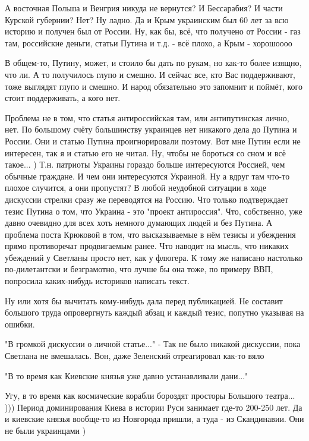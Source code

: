 \begin{itemize}
А восточная Польша и Венгрия никуда не вернутся? И Бессарабия? И части Курской
губернии? Нет? Ну ладно. Да и Крым украинским был 60 лет за всю историю и
получен был от России. Ну, как бы, всё, что получено от России - газ там,
российские деньги, статьи Путина и т.д. - всё плохо, а Крым - хорошоооо \Laughey[1.0][white]⁠ ⁠

В общем-то, Путину, может, и стоило бы дать по рукам, но как-то более изящно,
что ли. А то получилось глупо и смешно. И сейчас все, кто Вас поддерживают,
тоже выглядят глупо и смешно. И народ обязательно это запомнит и поймёт, кого
стоит поддерживать, а кого нет.


Проблема не в том, что статья антироссийская там, или антипутинская лично, нет.
По большому счёту большинству украинцев нет никакого дела до Путина и России.
Они и статью Путина проигнорировали поэтому. Вот мне Путин если не интересен,
так я и статью его не читал. Ну, чтобы не бороться со сном и всё такое... )
Т.н. патриоты Украины гораздо больше интересуются Россией, чем обычные
граждане. И чем они интересуются Украиной. Ну а вдруг там что-то плохое
случится, а они пропустят? В любой неудобной ситуации в ходе дискуссии стрелки
сразу же переводятся на Россию. Что только подтверждает тезис Путина о том, что
Украина - это "проект антироссия". Что, собственно, уже давно очевидно для всех
хоть немного думающих людей и без Путина. А проблема поста Крюковой в том, что
высказываемые в нём тезисы и убеждения прямо противоречат продвигаемым ранее.
Что наводит на мысль, что никаких убеждений у Светланы просто нет, как у
флюгера. К тому же написано настолько по-дилетантски и безграмотно, что лучше
бы она тоже, по примеру ВВП, попросила каких-нибудь историков написать текст. 

Ну или хотя бы вычитать кому-нибудь дала перед публикацией. Не составит
большого труда опровергнуть каждый абзац и каждый тезис, попутно указывая на
ошибки.

"В громкой дискуссии о личной статье..." - Так не было никакой дискуссии, пока
Светлана не вмешалась. Вон, даже Зеленский отреагировал как-то вяло \Smiley[1.0][yellow]⁠

"В то время как Киевские князья уже давно устанавливали дани..." 

Угу, в то время как космические корабли бороздят просторы Большого театра...
))) Период доминирования Киева в истории Руси занимает где-то 200-250 лет. Да и
киевские князья вообще-то из Новгорода пришли, а туда - из Скандинавии. Они не
были украинцами ) 


\end{itemize}
